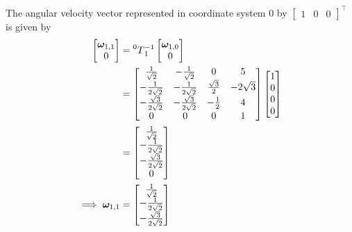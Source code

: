 \documentclass[a4paper]{scrartcl}
\begin{document}
\subsection{}
The angular velocity vector represented in coordinate system 0 by $\begin{bmatrix}
    1 & 0 & 0
\end{bmatrix}^\top$ is given by 
\begin{equation}
    \begin{aligned}
        \begin{bmatrix}
        \bm{\omega}_{1,1} \\ 0
        \end{bmatrix} &= \prescript{0}{}{T}_1^{-1} \begin{bmatrix}\bm{\omega}_{1,0}\\ 0 \end{bmatrix}\\
        &= \begin{bmatrix}
            \frac{1}{\sqrt{2}} & -\frac{1}{\sqrt{2}} & 0 & 5 \\
            -\frac{1}{2\sqrt{2}} & -\frac{1}{2\sqrt{2}} & \frac{\sqrt{3}}{2} & -2\sqrt{3}\\
            -\frac{\sqrt{3}}{2\sqrt{2}} & -\frac{\sqrt{3}}{2\sqrt{2}} & -\frac{1}{2} & 4\\
            0 & 0 & 0 & 1
        \end{bmatrix} \begin{bmatrix}
            1 \\ 0 \\0 \\0
        \end{bmatrix}\\
        &= \begin{bmatrix}
            \frac{1}{\sqrt{2}} \\  -\frac{1}{2\sqrt{2}} \\ -\frac{\sqrt{3}}{2\sqrt{2}} \\ 0
        \end{bmatrix}\\
        \implies \bm{\omega}_{1,1} &= \begin{bmatrix}
            \frac{1}{\sqrt{2}} \\  -\frac{1}{2\sqrt{2}} \\ -\frac{\sqrt{3}}{2\sqrt{2}}
        \end{bmatrix}
    \end{aligned}
\end{equation}
\end{document}
